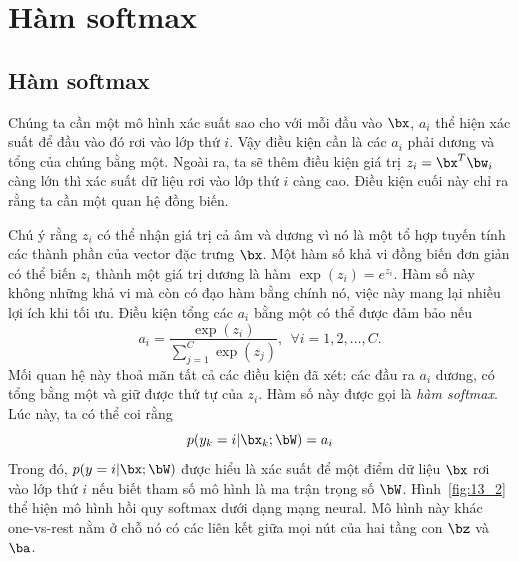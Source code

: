  
\section{Hàm softmax}
\subsection{Hàm softmax}

Chúng ta cần một mô hình xác suất sao cho với mỗi đầu vào $\bx$, $a_i$ thể hiện
xác suất để đầu vào đó rơi vào lớp thứ $i$. Vậy điều kiện cần là các $a_i$ phải
dương và tổng của chúng bằng một. Ngoài ra, ta sẽ thêm điều kiện giá trị $z_i =
\bx^T\bw_i$ càng lớn thì xác suất dữ liệu rơi vào lớp thứ $i$ càng cao. Điều
kiện cuối này chỉ ra rằng ta cần một quan hệ đồng biến.
 
Chú ý rằng $z_i$ có thể nhận giá trị cả âm và dương vì nó là một tổ hợp tuyến
tính các thành phần của vector đặc trưng $\bx$. Một hàm số khả vi đồng biến đơn
giản có thể biến $z_i $ thành một giá trị dương là hàm $\exp(z_i) = e^{z_i}$.
Hàm số này không những khả vi mà còn có đạo hàm bằng chính nó, việc này mang
lại nhiều lợi ích khi tối ưu. Điều kiện tổng các $a_i$ bằng một có
thể được đảm bảo nếu \begin{equation} a_i = \frac{\exp(z_i)}{\sum_{j=1}^C
\exp(z_j)}, ~~ \forall i = 1, 2, \dots, C.
\end{equation} 
Mối quan hệ này thoả mãn tất cả các điều kiện đã xét: các đầu ra $a_i$ dương, có
tổng bằng một và giữ được {thứ tự} của $z_i$. Hàm số này được gọi là
\textit{hàm softmax}. Lúc này, ta có thể coi rằng 
\begin{equation} 
p(y_k = i | \bx_k; \bW) = a_i 
\end{equation} 
Trong đó, $p(y = i | \bx; \bW)$ được hiểu là xác suất để một điểm
dữ liệu $\bx$ rơi vào lớp thứ $i$ nếu biết tham số mô hình là ma trận
trọng số $\bW$.  
Hình~\ref{fig:13_2} thể hiện mô hình hồi quy softmax dưới dạng mạng neural. Mô hình này khác one-vs-rest nằm ở chỗ nó có các liên kết giữa mọi nút của hai tầng con $\bz$ và $\ba$. 

   

